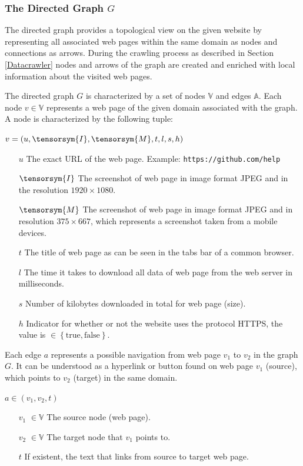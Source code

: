 \subsubsection{The Directed Graph $G$}
\label{TheDirectedGraph}
The directed graph provides a topological view on the given website by representing all associated web pages within the same domain as nodes and connections as arrows. During the crawling process as described in Section \ref{Datacrawler} nodes and arrows of the graph are created and enriched with local information about the visited web pages. 

The directed graph $G$ is characterized by a set of nodes $\mathbb{V}$ and edges $\mathbb{A}$. Each node $v \in \mathbb{V}$ represents a web page of the given domain associated with the graph. A node is characterized by the following tuple:

\begin{center}
$v = (u, \tensorsym{I}, \tensorsym{M},t, l, s, h)$
\begin{itemize}
	\item[$u$] The exact URL of the web page. Example: \texttt{https://github.com/help}
	\item[$\tensorsym{I}$] The screenshot of web page in image format JPEG and in the resolution $1920\times1080$. 
	\item[$\tensorsym{M}$] The screenshot of web page in image format JPEG and in resolution $375\times 667$, which represents a screenshot taken from a mobile devices.
	\item[$t$] The title of web page as can be seen in the tabs bar of a common browser.
	\item[$l$] The time it takes to download all data of web page from the web server in milliseconds.
	\item[$s$] Number of kilobytes downloaded in total for web page (size).
	\item[$h$] Indicator for whether or not the website uses the protocol HTTPS, the value is $\in\left\{\text{true}, \text{false}\right\}$.
\end{itemize}
\end{center}

Each edge $a$ represents a possible navigation from web page $v_1$ to $v_2$ in the graph $G$. It can be understood as a hyperlink or button found on web page $v_1$ (source), which points to $v_2$ (target) in the same domain. 

\begin{center}
	$a \in (v_1, v_2, t)$
	\begin{itemize}
		\item[$v_1$] $\in \mathbb{V}$ The source node (web page).
		\item[$v_2$] $\in \mathbb{V}$ The target node that $v_1$ points to.
		\item[$t$] If existent, the text that links from source to target web page.
	\end{itemize}
\end{center}

